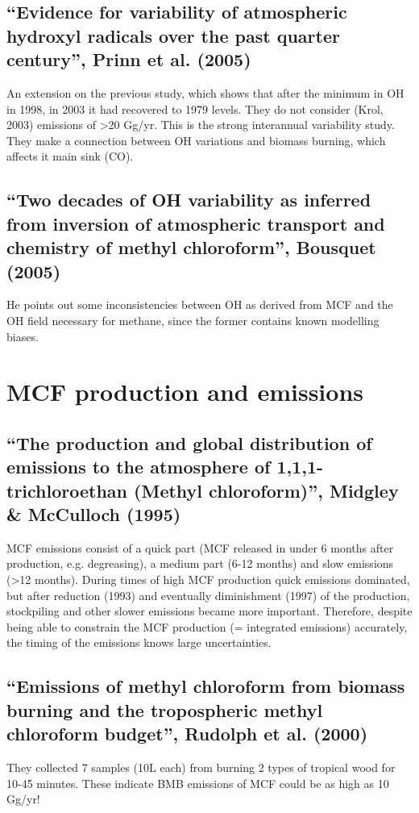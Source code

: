{\subsection{“Evidence for variability of atmospheric hydroxyl radicals over the past quarter century”, Prinn et al. (2005)}
An extension on the previous study, which shows that after the minimum in OH in 1998, in 2003 it had recovered to 1979 levels. They do not consider (Krol, 2003) emissions of >20 Gg/yr. This is the strong interannual variability study. They make a connection between OH variations and biomass burning, which affects it main sink (CO).

\subsection{“Two decades of OH variability as inferred from inversion of atmospheric transport and chemistry of methyl chloroform”, Bousquet (2005)}
He points out some inconsistencies between OH as derived from MCF and the OH field necessary for methane, since the former contains known modelling biases.

\section{MCF production and emissions}

\subsection{“The production and global distribution of emissions to the atmosphere of 1,1,1-trichloroethan (Methyl chloroform)”, Midgley & McCulloch (1995)}
MCF emissions consist of a quick part (MCF released in under 6 months after production, e.g. degreasing), a medium part (6-12 months) and slow emissions (>12 months). During times of high MCF production quick emissions dominated, but after reduction (1993) and eventually diminishment (1997) of the production, stockpiling and other slower emissions became more important. Therefore, despite being able to constrain the MCF production (= integrated emissions) accurately, the timing of the emissions knows large uncertainties.

\subsection{“Emissions of methyl chloroform from biomass burning and the tropospheric methyl chloroform budget”, Rudolph et al. (2000)}
They collected 7  samples (10L each) from burning 2 types of tropical wood for 10-45 minutes. These indicate BMB emissions of MCF could be as high as 10 Gg/yr!

}
